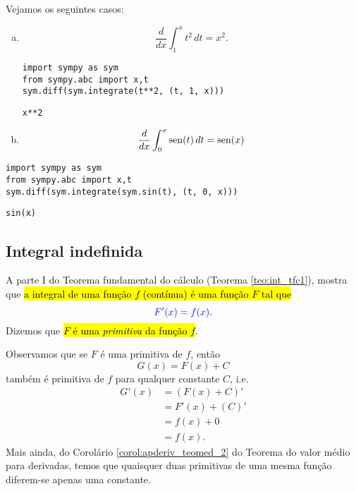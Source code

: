 \begin{ex}
  Vejamos os seguintes casos:
  \begin{enumerate}[a)]
  \item
    \begin{equation}
      \frac{d}{dx}\int_1^x t^2\,dt = x^2.
    \end{equation}

\begin{lstlisting}
import sympy as sym
from sympy.abc import x,t
sym.diff(sym.integrate(t**2, (t, 1, x)))
\end{lstlisting}

\begin{verbatim}
x**2
\end{verbatim}

  \item
    \begin{equation}
      \frac{d}{dx}\int_0^x \operatorname{sen}(t)\,dt = \operatorname{sen}(x)
    \end{equation}
  \end{enumerate}

\begin{lstlisting}
import sympy as sym
from sympy.abc import x,t  
sym.diff(sym.integrate(sym.sin(t), (t, 0, x)))
\end{lstlisting}

\begin{verbatim}
sin(x)
\end{verbatim}

\end{ex}

\subsection{Integral indefinida}

A parte I do Teorema fundamental do cálculo (Teorema \ref{teo:int_tfc1}), mostra que \hl{a integral de uma função $f$ (contínua) é uma função $F$ tal que}
\begin{equation}\color{blue}F'(x) = f(x).
\end{equation}
Dizemos que \hl{$F$ é uma \emph{primitiva} da função $f$}.

Observamos que se $F$ é uma primitiva de $f$, então
\begin{equation}
  G(x) = F(x) + C
\end{equation}
também é primitiva de $f$ para qualquer constante $C$, i.e.
\begin{align}
  G'(x) &= (F(x) + C)' \\
        &= F'(x) + (C)' \\
        &= f(x) + 0 \\
        &= f(x).
\end{align}
Mais ainda, do Corolário \ref{corol:apderiv_teomed_2} do Teorema do valor médio para derivadas, temos que quaisquer duas primitivas de uma mesma função diferem-se apenas uma constante.


